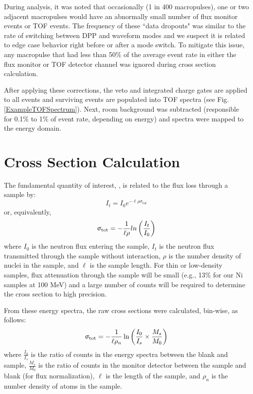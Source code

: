During analysis, it was noted that occasionally (1 in 400 macropulses), one or two 
adjacent macropulses would have an abnormally small number of flux monitor events or 
TOF events. The frequency of these ``data dropouts" was similar to the rate of
switching between DPP and waveform modes and we suspect it is related to edge
case behavior right before or after a mode switch. To mitigate this issue,
any macropulse that had less than 50\% of the average event rate in either the
flux monitor or TOF detector channel was ignored during cross section calculation.

After applying these corrections, the veto and integrated charge gates are applied to 
all events and surviving events are populated into TOF spectra (see Fig.
\ref{ExampleTOFSpectrum}). Next, room background was subtracted (responsible for 0.1\% to 
1\% of event rate, depending on energy) and spectra were mapped to the energy domain.

\section{Cross Section Calculation}
The fundamental quantity of interest, \tot, is related to the flux
loss through a sample by:
\begin{equation}
I_{t} = I_{0}e^{-{\ell\rho\sigma_{tot}}}
\end{equation}
or, equivalently,
\begin{equation}
    \upsigma_{\text{tot}} = -\frac{1}{\ell\rho}ln\left(\frac{I_{t}}{I_{0}}\right)
\end{equation}
where $I_{0}$ is the neutron flux entering the sample, $I_{t}$ is the neutron
flux transmitted through the sample without interaction, $\rho$ is the number
density of nuclei in the sample, and $\ell$ is the sample length. For thin
or low-density samples, flux attenuation through the sample will be small
(e.g., 13\% for our Ni samples at 100 MeV) and a large number
of counts will be required to determine the cross section to high
precision.

From these energy spectra, the raw cross sections were calculated, bin-wise, as follows:
\begin{equation} \label{CSCalculation}
    \upsigma_{\text{tot}} = -\frac{1}{\ell\rho_{n}}
    \ln \left(\frac{I_{0}}{I_{s}}\times\frac{M_{s}}{M_{0}}\right)
\end{equation}
where $\frac{I_{0}}{I_{s}}$ is the ratio of counts in the energy spectra between 
the blank and sample, $\frac{M_{s}}{M_{0}}$ is the ratio of counts in the
monitor detector between the sample and blank (for flux normalization), $\ell$ is the length 
of the sample, and $\rho_{n}$ is the number density of atoms in the sample.


